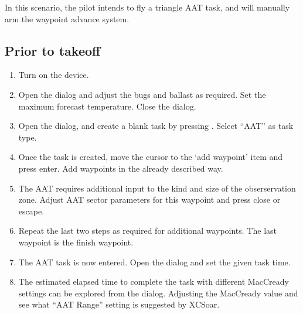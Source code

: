 \documentclass[a4paper,12pt]{refrep}
\begin{document}
In this scenario, the pilot intends to fly a triangle AAT task, and
will manually arm the waypoint advance system.

\subsection*{Prior to takeoff}
\begin{enumerate}
\item  Turn on the device.
\item  Open the  dialog and adjust the bugs and ballast as
required. Set the maximum forecast temperature.  Close the dialog.
\item Open the  dialog, and create a blank task by pressing
. Select ``AAT'' as task type.
\item  Once the task is created, move the cursor to the `add waypoint' item
and press enter.  Add waypoints in the already described way. 
\item  The AAT requires additional input to the kind and size of the
obserservation zone. Adjust AAT sector parameters for this waypoint and press
close or escape.
\item  Repeat the last two steps as required for additional waypoints.  The last
waypoint is the finish waypoint.
\item  The AAT task is now entered.  Open the  dialog
and set the given task time. 
\item  The estimated elapsed time to complete the task with different MacCready
settings can be explored from the  dialog.  Adjusting the MacCready value and see what
``AAT Range'' setting is suggested by XCSoar.
\end{enumerate}
\end{document}
